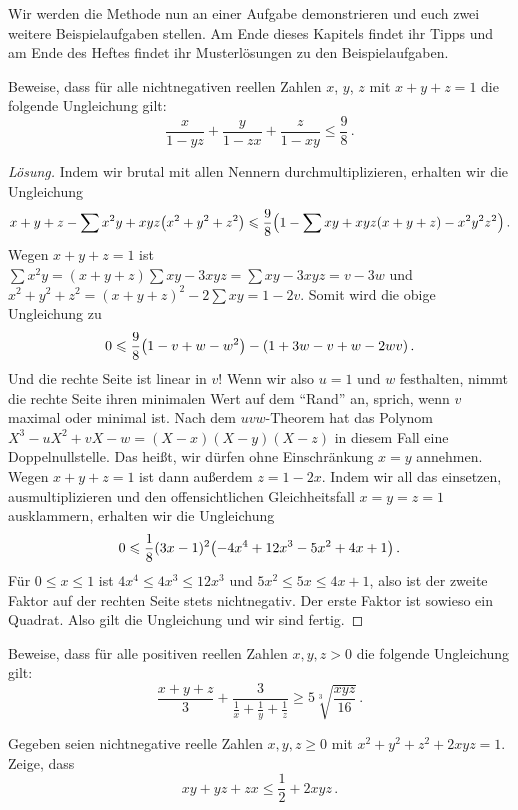 Wir werden die Methode nun an einer Aufgabe demonstrieren und euch zwei weitere  Beispielaufgaben stellen. Am Ende dieses Kapitels findet ihr Tipps und am Ende des Heftes findet ihr Musterlösungen zu den Beispielaufgaben.
\begin{aufgabe*}
	Beweise, dass für alle nichtnegativen reellen Zahlen $x$, $y$, $z$ mit $x+y+z=1$ die folgende Ungleichung gilt:
	\begin{equation*}
		\frac{x}{1-yz}+\frac{y}{1-zx}+\frac{z}{1-xy}\leqslant\frac 98\,.
	\end{equation*}
\end{aufgabe*}
\begin{proof}[Lösung]
	Indem wir brutal mit allen Nennern durchmultiplizieren, erhalten wir die Ungleichung
	\begin{equation*}
		x+y+z-\sum x^2y+xyz\parens*{x^2+y^2+z^2}\leqslant \frac 98\parens*{1-\sum xy+xyz(x+y+z)-x^2y^2z^2}\,.
	\end{equation*}
	Wegen $x+y+z=1$ ist $\sum x^2y=(x+y+z)\sum xy-3xyz=\sum xy-3xyz=v-3w$ und $x^2+y^2+z^2=(x+y+z)^2-2\sum xy=1-2v$. Somit wird die obige Ungleichung zu
	\begin{equation*}
		0\leqslant \frac 98\parens*{1-v+w-w^2}-\parens*{1+3w-v+w-2wv}\,.
	\end{equation*}
	Und die rechte Seite ist linear in $v$! Wenn wir also $u=1$ und $w$ festhalten, nimmt die rechte Seite ihren minimalen Wert auf dem \enquote{Rand} an, sprich, wenn $v$ maximal oder minimal ist. Nach dem $uvw$-Theorem hat das Polynom $X^3-uX^2+vX-w=(X-x)(X-y)(X-z)$ in diesem Fall eine Doppelnullstelle. Das heißt, wir dürfen ohne Einschränkung $x=y$ annehmen. Wegen $x+y+z=1$ ist dann außerdem $z=1-2x$. Indem wir all das einsetzen, ausmultiplizieren und den offensichtlichen Gleichheitsfall $x=y=z=1$ ausklammern, erhalten wir die Ungleichung
	\begin{equation*}
		0\leqslant \frac18(3x-1)^2\parens*{-4x^4+12x^3-5x^2+4x+1}\,.
	\end{equation*}
	Für $0\leqslant x\leqslant 1$ ist $4x^4\leqslant 4x^3\leqslant 12x^3$ und $5x^2\leqslant 5x\leqslant 4x+1$, also ist der zweite Faktor auf der rechten Seite stets nichtnegativ. Der erste Faktor ist sowieso ein Quadrat. Also gilt die Ungleichung und wir sind fertig.
\end{proof}

\begin{aufgabe*}\label{aufgabe:DEMO2015Ungleichung}
	Beweise, dass für alle positiven reellen Zahlen $x,y,z>0$ die folgende Ungleichung gilt:
	\begin{equation*}
		\frac{x+y+z}{3}+\frac{3}{\frac1x+\frac1y+\frac1z}\geqslant 5\sqrt[3]{\frac{xyz}{16}}\,.
	\end{equation*}
\end{aufgabe*}
\begin{aufgabe*}[*]\label{aufgabe:UngleichungInvertieren}
	Gegeben seien nichtnegative reelle Zahlen $x,y,z\geqslant 0$ mit $x^2+y^2+z^2+2xyz=1$. Zeige, dass
	\begin{equation*}
		xy+yz+zx\leqslant \frac12+2xyz\,.
	\end{equation*}
\end{aufgabe*}

